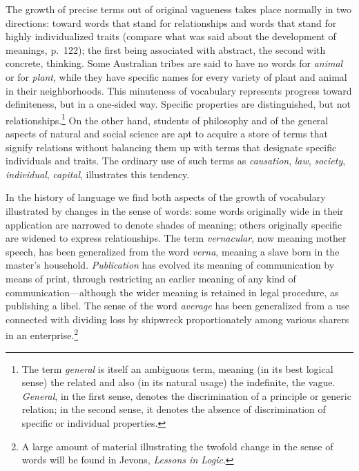 \documentclass[letterpaper]{book}
\begin{document}
The growth of precise terms out of original vagueness takes place
normally in two directions: toward words that stand for relationships
and words that stand for highly individualized traits (compare what was
said about the development of meanings, p.\ 122); the first being
associated with abstract, the second with concrete, thinking. Some
Australian tribes are said to have no words for \emph{animal} or for
\emph{plant}, while they have specific names for every variety of plant
and animal in their neighborhoods. This minuteness of vocabulary
represents
progress toward definiteness, but in a one-sided way. Specific
properties are distinguished, but not
relationships.\footnote{
The term \emph{general} is itself an ambiguous term, meaning (in its
best logical sense) the related and also (in its natural usage) the
indefinite, the vague. \emph{General}, in the first sense, denotes the
discrimination of a principle or generic relation; in the second sense,
it denotes the absence of discrimination of specific or individual
properties.
}
On the other hand, students of philosophy and of the general aspects of
natural and social science are apt to acquire a store of terms that
signify relations without balancing them up with terms that designate
specific individuals and traits. The ordinary use of such terms as
\emph{causation}, \emph{law}, \emph{society}, \emph{individual},
\emph{capital}, illustrates this tendency.


In the history of language we find both aspects of the growth of
vocabulary illustrated by changes in the sense of words: some words
originally wide in their application are narrowed to denote shades of
meaning; others originally specific are widened to express
relationships. The term \emph{vernacular}, now meaning mother speech,
has been generalized from the word \emph{verna}, meaning a slave born in
the master's household. \emph{Publication} has evolved its meaning of
communication by means of print, through restricting an earlier meaning
of any kind of communication---although the wider meaning is retained in
legal procedure, as publishing a libel. The sense of the word
\emph{average} has been generalized from a use connected with dividing
loss by shipwreck proportionately among various sharers in an
enterprise.\footnote{
A large amount of material illustrating the twofold change in the sense
of words will be found in Jevons, \emph{Lessons in Logic}.
}
\end{document}

